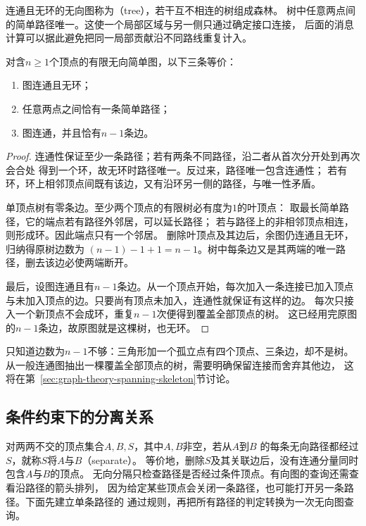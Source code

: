 连通且无环的无向图称为（tree），若干互不相连的树组成森林。
树中任意两点间的简单路径唯一。这使一个局部区域与另一侧只通过确定接口连接，
后面的消息计算可以据此避免把同一局部贡献沿不同路线重复计入。

\begin{theorem}[树的等价刻画]
  \label{thm:graph-theory-tree-characterizations}
  对含\(n\geq1\)个顶点的有限无向简单图，以下三条等价：
  \begin{enumerate}
    \item 图连通且无环；
    \item 任意两点之间恰有一条简单路径；
    \item 图连通，并且恰有\(n-1\)条边。
  \end{enumerate}
\end{theorem}

\begin{proof}
连通性保证至少一条路径；若有两条不同路径，沿二者从首次分开处到再次会合处
得到一个环，故无环时路径唯一。反过来，路径唯一包含连通性；
若有环，环上相邻顶点间既有该边，又有沿环另一侧的路径，与唯一性矛盾。

单顶点树有零条边。至少两个顶点的有限树必有度为\(1\)的叶顶点：
取最长简单路径，它的端点若有路径外邻居，可以延长路径；
若与路径上的非相邻顶点相连，则形成环。因此端点只有一个邻居。
删除叶顶点及其边后，余图仍连通且无环，归纳得原树边数为
\((n-1)-1+1=n-1\)。树中每条边又是其两端的唯一路径，删去该边必使两端断开。

最后，设图连通且有\(n-1\)条边。从一个顶点开始，每次加入一条连接已加入顶点
与未加入顶点的边。只要尚有顶点未加入，连通性就保证有这样的边。
每次只接入一个新顶点不会成环，重复\(n-1\)次便得到覆盖全部顶点的树。
这已经用完原图的\(n-1\)条边，故原图就是这棵树，也无环。
\end{proof}

只知道边数为\(n-1\)不够：三角形加一个孤立点有四个顶点、三条边，却不是树。
从一般连通图抽出一棵覆盖全部顶点的树，需要明确保留连接而舍弃其他边，
这将在第~\ref{sec:graph-theory-spanning-skeleton}节讨论。

\subsection{条件约束下的分离关系}

对两两不交的顶点集合\(A,B,S\)，其中\(A,B\)非空，若从\(A\)到\(B\)
的每条无向路径都经过\(S\)，就称\(S\)将\(A\)与\(B\)（separate）。
等价地，删除\(S\)及其关联边后，没有连通分量同时包含\(A\)与\(B\)的顶点。
无向分隔只检查路径是否经过条件顶点。有向图的查询还需查看沿路径的箭头排列，
因为给定某些顶点会关闭一条路径，也可能打开另一条路径。下面先建立单条路径的
通过规则，再把所有路径的判定转换为一次无向图查询。

